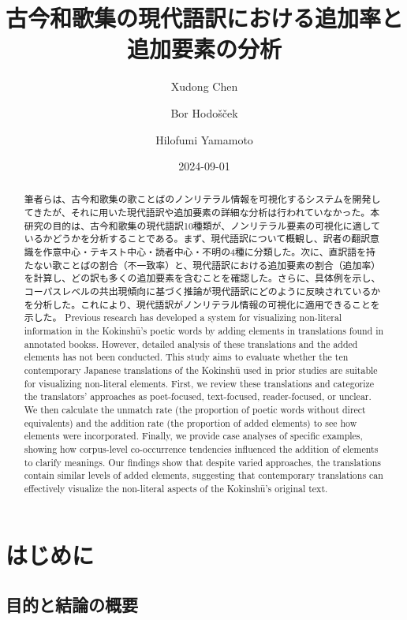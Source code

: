 \documentclass[
  letterpaper,
  DIV=11,
  numbers=noendperiod]{scrartcl}
\title{古今和歌集の現代語訳における追加率と追加要素の分析}
\author{Xudong Chen \and Bor Hodošček \and Hilofumi Yamamoto}
\date{2024-09-01}
\renewcommand*\contentsname{Table of contents}
\newcommand\contentsname{Table of contents}
\begin{document}
\maketitle
\begin{abstract}
筆者らは、古今和歌集の歌ことばのノンリテラル情報を可視化するシステムを開発してきたが、それに用いた現代語訳や追加要素の詳細な分析は行われていなかった。本研究の目的は、古今和歌集の現代語訳10種類が、ノンリテラル要素の可視化に適しているかどうかを分析することである。まず、現代語訳について概観し、訳者の翻訳意識を作意中心・テキスト中心・読者中心・不明の4種に分類した。次に、直訳語を持たない歌ことばの割合（不一致率）と、現代語訳における追加要素の割合（追加率）を計算し、どの訳も多くの追加要素を含むことを確認した。さらに、具体例を示し、コーパスレベルの共出現傾向に基づく推論が現代語訳にどのように反映されているかを分析した。これにより、現代語訳がノンリテラル情報の可視化に適用できることを示した。
Previous research has developed a system for visualizing non-literal
information in the Kokinshū's poetic words by adding elements in
translations found in annotated bookss. However, detailed analysis of
these translations and the added elements has not been conducted. This
study aims to evaluate whether the ten contemporary Japanese
translations of the Kokinshū used in prior studies are suitable for
visualizing non-literal elements. First, we review these translations
and categorize the translators' approaches as poet-focused,
text-focused, reader-focused, or unclear. We then calculate the unmatch
rate (the proportion of poetic words without direct equivalents) and the
addition rate (the proportion of added elements) to see how elements
were incorporated. Finally, we provide case analyses of specific
examples, showing how corpus-level co-occurrence tendencies influenced
the addition of elements to clarify meanings. Our findings show that
despite varied approaches, the translations contain similar levels of
added elements, suggesting that contemporary translations can
effectively visualize the non-literal aspects of the Kokinshū's original
text.
\end{abstract}

\renewcommand*\contentsname{目次}
{
\hypersetup{linkcolor=}
\setcounter{tocdepth}{3}
\tableofcontents
}
\section{はじめに}\label{ux306fux3058ux3081ux306b}

\subsection{目的と結論の概要}\label{ux76eeux7684ux3068ux7d50ux8ad6ux306eux6982ux8981}
\end{document}
